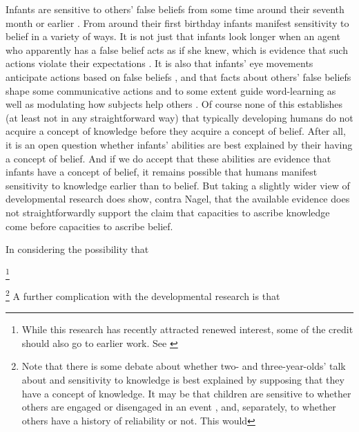 \documentclass[11pt,a4paper]{extarticle}
\begin{document}
Infants are sensitive to others' false beliefs from some time around their seventh month or earlier \citep{kovacs_social_2010}.
From around their first birthday infants manifest sensitivity to belief in a variety of ways.
It is not just that infants look longer when an agent who apparently has a false belief acts as if she knew, which is evidence that such actions violate their expectations  \citep{Onishi:2005hm,Surian:2007hl}.
It is also that infants' eye movements anticipate actions based on false beliefs \citep{Southgate:2007js},
and that facts about others' false beliefs shape some communicative actions \citep{Knudsen:2011fk} and to some extent guide word-learning \citep{Carpenter:2002gc} as well as modulating how subjects help others \citep{Buttelmann:2009gy}.
Of course none of this establishes (at least not in any straightforward way) that typically developing humans do not acquire a concept of knowledge before they acquire a concept of belief.
After all, it is an open question whether infants' abilities are best explained by their having a concept of belief.
And if we do accept that these abilities are evidence that infants have a concept of belief, it remains possible that humans manifest sensitivity to knowledge earlier than to belief.
But taking a slightly wider view of developmental research does show, contra Nagel, that the available evidence does not  straightforwardly support the claim that capacities to ascribe knowledge come before  capacities to ascribe  belief.

In considering the possibility that 





 
\footnote{
While this research has recently attracted renewed interest, some of the credit should also go to earlier work. 
See \citet{Clements:1994cw,Garnham:2001jm,Garnham:2001ql,Ruffman:2001ng}
}


%
\footnote{
Note that there is some debate about whether two- and three-year-olds' talk about and sensitivity to knowledge is best explained by supposing that they have a concept of knowledge.
It may be that children are sensitive to whether others are engaged or disengaged in an event \citep{ONeill:1996um}, and, separately, to whether others have a history of reliability or not.
This would 

} 
A further complication with the developmental research is that 


 
 
\end{document}
